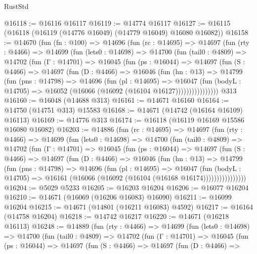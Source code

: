 \begin{lexlean}{RustStd}
\begin{coremodule}
@16118 := @16116 @16117
@16119 := @14774 @16117
@16127 := @16115 (@16118 (@16119 (@14776 @16049) (@14779 @16049) @16080 @16082))
@16158 := @14670
    (fun (fn : @100) =>
    @14696
      (fun (rc : @14695) =>
      @14697
        (fun (rty : @4466) =>
        @14699
          (fun (lets0 : @14698) =>
          @14700
            (fun (tail0 : @4809) =>
            @14702
              (fun (Γ : @14701) =>
              @16045
                (fun (ps : @16044) =>
                @14697
                  (fun (S : @4466) =>
                  @14697
                    (fun (D : @4466) =>
                    @16046
                      (fun (hn : @13) =>
                      @14799
                        (fun (pns : @14798) =>
                        @14696
                          (fun (pl : @14695) =>
                          @16047
                            (fun (bodyL : @14705) =>
                            @16052 (@16066 (@16092 (@16104 @16127))))))))))))))))
    @313
@16160 := @16048 (@14688 @313)
@16161 := @14671 @16160
@16164 := @14750 (@14751 @313) @15583
@16168 := @14671 (@14742 (@16164 @16109) @16113)
@16169 := @14776 @313
@16174 := @16118 (@16119 @16169 @15586 @16080 @16082)
@16203 := @14886
    (fun (rc : @14695) =>
    @14697
      (fun (rty : @4466) =>
      @14699
        (fun (lets0 : @14698) =>
        @14700
          (fun (tail0 : @4809) =>
          @14702
            (fun (Γ : @14701) =>
            @16045
              (fun (ps : @16044) =>
              @14697
                (fun (S : @4466) =>
                @14697
                  (fun (D : @4466) =>
                  @16046
                    (fun (hn : @13) =>
                    @14799
                      (fun (pns : @14798) =>
                      @14696
                        (fun (pl : @14695) =>
                        @16047
                          (fun (bodyL : @14705) =>
                          @16161 (@16066 (@16092 (@16104 (@16168 @16174))))))))))))))))
@16204 := @5029 @5233
@16205 := @16203 @16204
@16206 := @16077 @16204
@16210 := @14671 (@16069 (@16206 @16083) @16090)
@16211 := @16099 @16204
@16215 := @14671 (@14801 (@16211 @16083) @4592)
@16217 := @16164 (@14758 @16204)
@16218 := @14742 @16217
@16220 := @14671 (@16218 @16113)
@16248 := @14889
    (fun (rty : @4466) =>
    @14699
      (fun (lets0 : @14698) =>
      @14700
        (fun (tail0 : @4809) =>
        @14702
          (fun (Γ : @14701) =>
          @16045
            (fun (ps : @16044) =>
            @14697
              (fun (S : @4466) =>
              @14697
                (fun (D : @4466) =>

\end{coremodule}
\end{lexlean}
